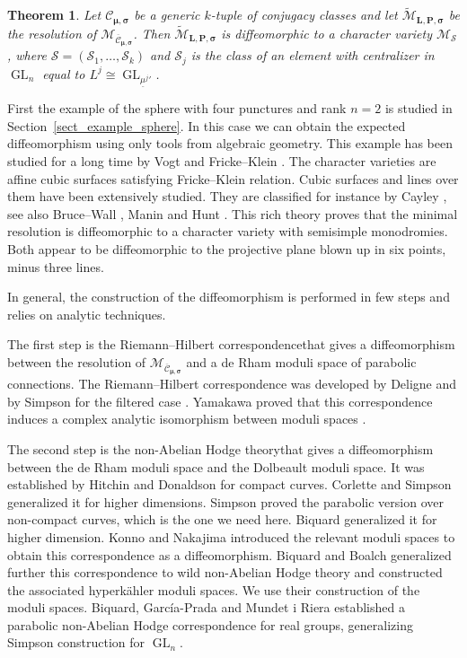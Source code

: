 \documentclass[JEP,XML,SOM,NoEqCountersInSection,Unicode,published]{cedram}
\theoremstyle{definition}
\theoremstyle{plain}
\newtheorem{theorem}[definition]{Theorem}
\DeclareMathOperator{\GL}{GL}
\newcommand{\mcmus}{\mathcal{M}_{\overline{\mathcal{C}}_{\boldsymbol{\mu},\boldsymbol{\sigma}}}}
\newcommand{\mlps}{\widetilde{\mathcal{M}}_{\boldsymbol{L},\boldsymbol{P},\boldsymbol{\sigma}}}
\begin{document}
\begin{theorem}\label{th_diffeo_resol_ss}
Let $\mathcal{C}_{\boldsymbol{\mu},\boldsymbol{\sigma}}$ be a generic $k$-tuple of conjugacy classes and let $\mlps$ be the resolution of $\mcmus$. Then $\mlps$ is diffeomorphic to a character variety $\mathcal{M}_{\boldsymbol{\mathcal{S}}}$, where $\boldsymbol{\mathcal{S}}=\left(\mathcal{S}_1,\dots,\mathcal{S}_k\right)$ and $\mathcal{S}_j$ is the class of an element with centralizer in $\GL_n$ equal to $L^j\cong \GL_{{\underline{\mu}^j}'}$.
\end{theorem}

First the example of the sphere with four punctures and rank $n=2$ is studied in Section~\ref{sect_example_sphere}. In this case we can obtain the expected diffeomorphism using only tools from algebraic geometry. This example has been studied for a long time by Vogt \cite{Vogt} and Fricke--Klein \cite{Fricke_Klein}. The character varieties are affine cubic surfaces satisfying Fricke--Klein relation. Cubic surfaces and lines over them have been extensively studied. They are classified for instance by Cayley \cite{Cayley}, see also Bruce--Wall \cite{Bruce_cubic}, Manin \cite{Manin1986} and Hunt \cite{Hunt}. This rich theory proves that the minimal resolution is diffeomorphic to a character variety with semisimple monodromies. Both appear to be diffeomorphic to the projective plane blown up in six points, minus three lines.

In general, the construction of the diffeomorphism is performed in few steps and relies on analytic techniques.

The first step is the Riemann--Hilbert correspondencethat gives a diffeomorphism between the resolution of $\mathcal{M}_{\overline{{\mathcal{C}}}_{\boldsymbol{\mu},\boldsymbol{\sigma}}}$ and a de Rham moduli space of parabolic connections. The Riemann--Hilbert correspondence was developed by Deligne \cite{Deligne_equadif_rh} and by Simpson for the filtered case \cite{Simpson}. Yamakawa proved that this correspondence induces a complex analytic isomorphism between moduli spaces \cite{Yamakawa}.

The second step is the non-Abelian Hodge theorythat gives a diffeomorphism between the de Rham moduli space and the Dolbeault moduli space. It was established by Hitchin \cite{Hitchin87} and Donaldson \cite{Donaldson} for compact curves. Corlette \cite{Corlette} and Simpson \cite{Simpson_88} generalized it for higher dimensions. Simpson \cite{Simpson} proved the parabolic version over non-compact curves, which is the one we need here. Biquard \cite{Biquard97} generalized it for higher dimension. Konno \cite{Konno} and Nakajima \cite{Nakajima_1996} introduced the relevant moduli spaces to obtain this correspondence as a diffeomorphism. Biquard and Boalch \cite{Biquard_Boalch_2004} generalized further this correspondence to wild non-Abelian Hodge theory and constructed the associated hyperkähler moduli spaces. We use their construction of the moduli spaces. Biquard, García-Prada and Mundet i Riera \cite{Biquard_Garcia_Prada_Riera} established a parabolic non-Abelian Hodge correspondence for real groups, generalizing Simpson construction for $\GL_n$.
\end{document}
